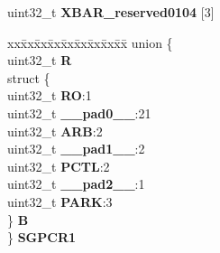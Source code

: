 \begin{DoxyCompactItemize}
\begin{tabbing}
\end{tabbing}\item 
\mbox{\label{structXBAR__tag_a695cfeb6bb574491c469dde2a4c4e54d}} 
uint32\+\_\+t {\bfseries X\+B\+A\+R\+\_\+reserved0104} \mbox{[}3\mbox{]}
\item 
\mbox{\label{structXBAR__tag_a43ffdae4b05c404f0f5d3bcc2a493ad5}} 
\begin{tabbing}
xx\=xx\=xx\=xx\=xx\=xx\=xx\=xx\=xx\=\kill
union \{\\
\>uint32\_t {\bfseries R}\\
\>struct \{\\
\>\>uint32\_t {\bfseries RO}:1\\
\>\>uint32\_t {\bfseries \_\_pad0\_\_}:21\\
\>\>uint32\_t {\bfseries ARB}:2\\
\>\>uint32\_t {\bfseries \_\_pad1\_\_}:2\\
\>\>uint32\_t {\bfseries PCTL}:2\\
\>\>uint32\_t {\bfseries \_\_pad2\_\_}:1\\
\>\>uint32\_t {\bfseries PARK}:3\\
\>\} {\bfseries B}\\
\} {\bfseries SGPCR1}\\


\end{tabbing}
\end{DoxyCompactItemize}
